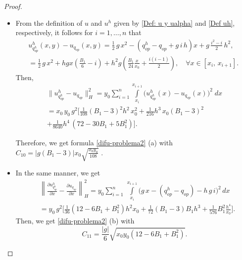 \documentclass[11pt]{article}
\newcommand\pder[2][]{\ensuremath{\tfrac{\partial#1}{\partial#2}}}
\begin{document}
\begin{proof}$ $
    \begin{itemize}
      
       \item[(a)] From the definition of $u$ and ${u^h}$ given by \eqref{Def: u y ualpha} and \eqref{Def uh}, respectively, it follows for $i= 1,\ldots, n$ that
  		      \begin{equation}
  		      \begin{array}{ll}
  		       {u^h_{q^h_{op}}}(x,y) - u_{q_{op}}(x,y) =  \tfrac{1}{2} \,g \,x^2-( {q^h_{op}} - q_{op} + g\,i\,h) x + g \,\tfrac{i^2-i}{2}\, h^2 , \quad \\[0.45cm]
  		        =\tfrac{1}{2} \,g \,x^2+h g x\left(\tfrac{B_1}{6}-i \right)+h^2g \left(\tfrac{B_1}{24}\tfrac{x}{x_0}+\tfrac{i(i-1)}{2} \right),\quad \forall x\in [x_i,\,x_{i+1}].
  		        \end{array}
  		        \end{equation}
  		      Then,  
\begin{equation*}
\begin{array}{ll} 
       \lVert {u^h_{q^h_{op}}} - u_{q_{op}}  \rVert _H^2= y_0 \displaystyle\sum\limits_{i=1}^n \displaystyle\int\limits_{x_i}^{x_{i+1}} \Big( {u^h_{q^h_{op}}}(x)-u_{q_{op}}(x)\Big)^2\; dx\\[0.45cm] 
      = x_0\, y_0\, g^2 \Big[\tfrac{1}{108} ( B_1-3)^2 h^2 \,x_0^2+\tfrac{1}{216} h^3\, x_0  (  B_1-3)^2 \\[0.45cm]
      +\frac{1}{8640} h^4\, (72 - 30 B_1 + 5 B_1^2)\Big].
           \end{array}
           \end{equation*}
           
Therefore, we get formula \eqref{difu-problema2} (a) with $C_{10}= \lvert  g (B_1-3)\rvert x_0 \sqrt{\tfrac{x_0 y_0}{108}}$ .
           
           \item [(b)] In the same manner, we get  
            $$\begin{array}{ll}
          &  \left\lVert \pder[{u^h_{q^h_{op}}}]{x} - \pder[u_{q_{op}}]{x}   \right\rVert _H^2 = y_0 \displaystyle \sum\limits_{i=1}^{n} \, \int\limits_{x_i} ^{x_{i+1}} \Big ( g\,x  -({q^h_{op}} - q_{op} ) - h\,g\,i\Big )^2\,dx \\
&=y_0\,g^2\Big[\tfrac{1}{36 }(12 - 6 B_1 + B_1^2) h^2   x_0 +\tfrac{1}{72} (B_1-3) B_1  h^3 +\tfrac{1}{576 }B_1^2  \frac{h^4}{x_0} \Big].
\end{array}$$
  	Then, we get \eqref{difu-problema2} (b) with $$C_{11}=\frac{|g|}{6}\sqrt{x_0 y_0 (12-6B_1+B_1^2)} .$$
 		         
    \end{itemize}
    \end{proof}
       
\end{document}
